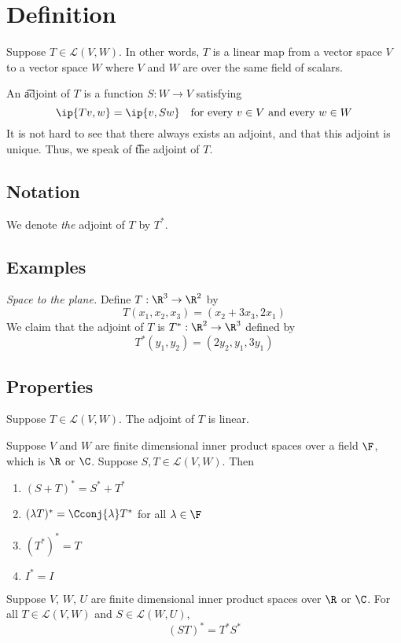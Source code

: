 
\section*{Definition}

Suppose $T \in \mathcal{L} (V, W)$.
In other words, $T$ is a linear map from a vector space $V$ to a vector space $W$ where $V$ and $W$ are over the same field of scalars.

An \t{adjoint} of $T$ is a function $S: W \to V$ satisfying
\[
\ip{Tv, w} = \ip{v, Sw} \quad \text{for every } v \in V \text{ and every } w \in W
\]
It is not hard to see that there always exists an adjoint, and that this adjoint is unique.
Thus, we speak of \t{the adjoint} of $T$.

\subsection*{Notation}

We denote \textit{the} adjoint of $T$ by $T^*$.

\subsection*{Examples}

\textit{Space to the plane.}
Define $T: \R ^3 \to \R ^2$ by
\[
T(x_1, x_2, x_3) = (x_2 + 3x_3, 2x_1)
\]
We claim that the adjoint of $T$ is $T^*: \R ^2 \to \R ^3$ defined by
\[
T^*(y_1, y_2) = (2y_2, y_1, 3y_1)
\]


\subsection*{Properties}

\begin{proposition}
Suppose $T \in \mathcal{L} (V, W)$.
The adjoint of $T$ is linear.
\end{proposition}

\begin{proposition}
Suppose $V$ and $W$ are finite dimensional inner product spaces over a field $\F $, which is $\R $ or $\C $.
Suppose $S, T \in \mathcal{L} (V, W)$.
Then
  \begin{enumerate}
    \item $(S + T)^* = S^* + T^*$
    \item $(\lambda T)^* = \Cconj{\lambda }T^*$ for all $\lambda \in \F $
    \item $ (T^*)^* = T$
    \item $ I^* = I$
  \end{enumerate}
\end{proposition}

\begin{proposition}
Suppose $V$, $W$, $U$ are finite dimensional inner product spaces over $\R $ or $\C $.
For all $T \in \mathcal{L} (V, W)$ and $S \in \mathcal{L} (W, U)$,
\[
(ST)^* = T^*S^*
\]
\end{proposition}

\blankpage